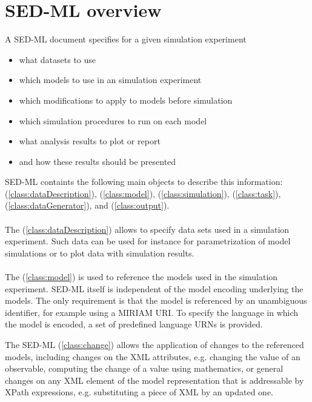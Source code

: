 \section{SED-ML overview}
A SED-ML document specifies for a given simulation experiment

\begin{itemize}
\item what datasets to use
\item which models to use in an simulation experiment
\item which modifications to apply to models before simulation
\item which simulation procedures to run on each model
\item what analysis results to plot or report
\item and how these results should be presented
\end{itemize}

SED-ML containts the following main objects to describe this information:  (\ref{class:dataDescription}),  (\ref{class:model}),  (\ref{class:simulation}),  (\ref{class:task}),  (\ref{class:dataGenerator}), and  (\ref{class:output}).

\paragraph*{}
The  (\ref{class:dataDescription}) allows to specify data sets used in a simulation experiment. Such data can be used for instance for parametrization of model simulations or to plot data with simulation results.

\paragraph*{}
The  (\ref{class:model}) is used to reference the models used in the simulation experiment. SED-ML itself is independent of the model encoding underlying the models. The only requirement is that the model is referenced by an unambiguous identifier, for example using a MIRIAM URI. To specify the language in which the model is encoded, a set of predefined language URNs is provided.

The SED-ML  (\ref{class:change}) allows the application of changes to the referenced models, including changes on the XML attributes, e.g. changing the value of an observable, computing the change of a value using mathematics, or general changes on any XML element of the model representation that is addressable by XPath expressions, e.g. substituting a piece of XML by an updated one.

